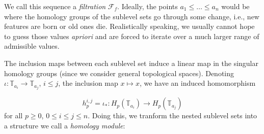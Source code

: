   We call this sequence a \textit{filtration} $\mathcal{F}_{f}$. Ideally, the points $a_{1} \leq \ldots \leq a_{n}$ would be where the homology groups of the sublevel sets go through some change, i.e., new features are born or old ones die. Realistically speaking, we usually cannot hope to guess those values \textit{apriori} and are forced to iterate over a much larger range of admissible values.

  The inclusion maps between each sublevel set induce a linear map in the singular homology groups (since we consider general topological spaces). Denoting $\iota: \mathbb{T}_{a_{i}} \to \mathbb{T}_{a_{j}}$, $i \leq j$, the inclusion map $x \mapsto x$, we have an induced homomorphism

  \begin{equation*}
    h_{p}^{i,j} = \iota_{*}: H_{p}(\mathbb{T}_{a_{i}}) \to H_{p}(\mathbb{T}_{a_{j}})
  \end{equation*}
  for all $p \geq 0$, $0 \leq i \leq j \leq n$. Doing this, we tranform the nested sublevel sets into a structure we call a \textit{homology module}:

  \begin{figure}[h]
    \centering
  \end{figure}
